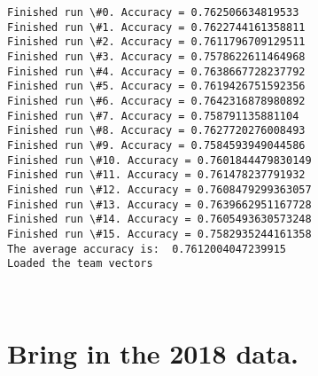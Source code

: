 \documentclass[11pt]{article}
\begin{document}
    \begin{Verbatim}[commandchars=\\\{\}]
Finished run \#0. Accuracy = 0.762506634819533
Finished run \#1. Accuracy = 0.7622744161358811
Finished run \#2. Accuracy = 0.7611796709129511
Finished run \#3. Accuracy = 0.7578622611464968
Finished run \#4. Accuracy = 0.7638667728237792
Finished run \#5. Accuracy = 0.7619426751592356
Finished run \#6. Accuracy = 0.7642316878980892
Finished run \#7. Accuracy = 0.758791135881104
Finished run \#8. Accuracy = 0.7627720276008493
Finished run \#9. Accuracy = 0.7584593949044586
Finished run \#10. Accuracy = 0.7601844479830149
Finished run \#11. Accuracy = 0.761478237791932
Finished run \#12. Accuracy = 0.7608479299363057
Finished run \#13. Accuracy = 0.7639662951167728
Finished run \#14. Accuracy = 0.7605493630573248
Finished run \#15. Accuracy = 0.7582935244161358
The average accuracy is:  0.7612004047239915
Loaded the team vectors

    \end{Verbatim}

    \begin{center}
    \end{center}
    { \hspace*{\fill} \\}
    
    \hypertarget{bring-in-the-2018-data.}{%
\section{Bring in the 2018 data.}\label{bring-in-the-2018-data.}}
\end{document}
